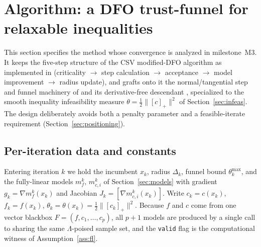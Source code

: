 \section{Algorithm: a DFO trust-funnel for relaxable inequalities}
\label{sec:algorithm}

This section specifies the method whose convergence is analyzed in
milestone~M3. It keeps the five-step structure of the CSV modified-DFO
algorithm as implemented in 
(criticality $\to$ step calculation $\to$ acceptance $\to$ model improvement
$\to$ radius update), and grafts onto it the normal/tangential step and funnel
machinery of \citet{GouldToint2010} and its derivative-free descendant
\citet{SampaioToint2015}, specialized to the smooth inequality infeasibility measure
$\theta=\tfrac12\|[c]_+\|^2$ of Section~\ref{sec:infeas}. The design deliberately avoids
both a penalty parameter and a feasible-iterate requirement
(Section~\ref{sec:positioning}).

\subsection{Per-iteration data and constants}
\label{sec:algo-data}

Entering iteration $k$ we hold the incumbent $x_k$, radius $\Delta_k$, funnel
bound $\theta_k^{\max}$, and the fully-linear models $m_f^k,\,m_{c,i}^k$ of
Section~\ref{sec:models} with gradient $g_k=\nabla m_f^k(x_k)$ and Jacobian
$J_k=[\nabla m_{c,i}^k(x_k)]$. Write $c_k=c(x_k)$, $f_k=f(x_k)$,
$\theta_k=\theta(x_k)=\tfrac12\|[c_k]_+\|^2$. Because $f$ and $c$ come from one vector
blackbox $F=(f,c_1,\dots,c_p)$, all $p+1$ models are produced by a single call to
 sharing the same $\Lambda$-poised sample set, and the
\verb|valid| flag is the computational witness of Assumption~\ref{ass:fl}.

